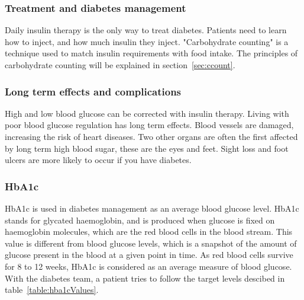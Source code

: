 \subsubsection{Treatment and diabetes management}
Daily insulin therapy is the only way to treat diabetes. Patients need to learn how to inject, and how much insulin they inject. "Carbohydrate counting" is a technique used to match insulin requirements with food intake. The principles of carbohydrate counting will be explained in section~\ref{sec:ccount}.

\subsubsection{Long term effects and complications}
High and low blood glucose can be corrected with insulin therapy. Living with poor blood glucose regulation has long term effects. Blood vessels are damaged, increasing the risk of heart diseases. Two other organs are often the first affected by long term high blood sugar, these are the eyes and feet. Sight loss and foot ulcers are more likely to occur if you have diabetes.  

\subsubsection{HbA1c}
HbA1c is used in diabetes management as an average blood glucose level. HbA1c stands for glycated haemoglobin, and is produced when glucose is fixed on haemoglobin molecules, which are the red blood cells in the blood stream. 
This value is different from blood glucose levels, which is a snapshot of the amount of glucose present in the blood at a given point in time. As red blood cells survive for 8 to 12 weeks, HbA1c is considered as an average measure of blood glucose. With the diabetes team, a patient tries to follow the target levels descibed in table~\ref{table:hba1cValues}.

